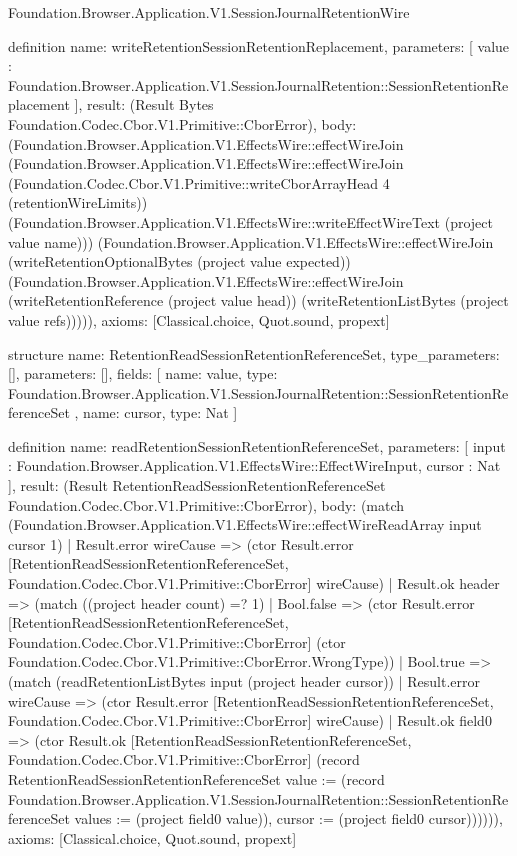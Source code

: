 \begin{lexlean}{Foundation.Browser.Application.V1.SessionJournalRetentionWire}
\begin{semanticmodule}
definition{
  name: writeRetentionSessionRetentionReplacement,
  parameters: [
    value : Foundation.Browser.Application.V1.SessionJournalRetention::SessionRetentionReplacement
  ],
  result: (Result Bytes Foundation.Codec.Cbor.V1.Primitive::CborError),
  body: (Foundation.Browser.Application.V1.EffectsWire::effectWireJoin (Foundation.Browser.Application.V1.EffectsWire::effectWireJoin (Foundation.Codec.Cbor.V1.Primitive::writeCborArrayHead 4 (retentionWireLimits)) (Foundation.Browser.Application.V1.EffectsWire::writeEffectWireText (project value name))) (Foundation.Browser.Application.V1.EffectsWire::effectWireJoin (writeRetentionOptionalBytes (project value expected)) (Foundation.Browser.Application.V1.EffectsWire::effectWireJoin (writeRetentionReference (project value head)) (writeRetentionListBytes (project value refs))))),
  axioms: [Classical.choice, Quot.sound, propext]
}

structure{
  name: RetentionReadSessionRetentionReferenceSet,
  type_parameters: [],
  parameters: [],
  fields: [
    {
      name: value,
      type: Foundation.Browser.Application.V1.SessionJournalRetention::SessionRetentionReferenceSet
    },
    {name: cursor, type: Nat}
  ]
}

definition{
  name: readRetentionSessionRetentionReferenceSet,
  parameters: [
    input : Foundation.Browser.Application.V1.EffectsWire::EffectWireInput,
    cursor : Nat
  ],
  result: (Result RetentionReadSessionRetentionReferenceSet Foundation.Codec.Cbor.V1.Primitive::CborError),
  body: (match (Foundation.Browser.Application.V1.EffectsWire::effectWireReadArray input cursor 1)
    | Result.error wireCause => (ctor Result.error [RetentionReadSessionRetentionReferenceSet, Foundation.Codec.Cbor.V1.Primitive::CborError] wireCause)
    | Result.ok header => (match ((project header count) =? 1)
      | Bool.false => (ctor Result.error [RetentionReadSessionRetentionReferenceSet, Foundation.Codec.Cbor.V1.Primitive::CborError] (ctor Foundation.Codec.Cbor.V1.Primitive::CborError.WrongType))
      | Bool.true => (match (readRetentionListBytes input (project header cursor))
        | Result.error wireCause => (ctor Result.error [RetentionReadSessionRetentionReferenceSet, Foundation.Codec.Cbor.V1.Primitive::CborError] wireCause)
        | Result.ok field0 => (ctor Result.ok [RetentionReadSessionRetentionReferenceSet, Foundation.Codec.Cbor.V1.Primitive::CborError] (record RetentionReadSessionRetentionReferenceSet {value := (record Foundation.Browser.Application.V1.SessionJournalRetention::SessionRetentionReferenceSet {values := (project field0 value)}), cursor := (project field0 cursor)}))))),
  axioms: [Classical.choice, Quot.sound, propext]
}


\end{semanticmodule}
\end{lexlean}
